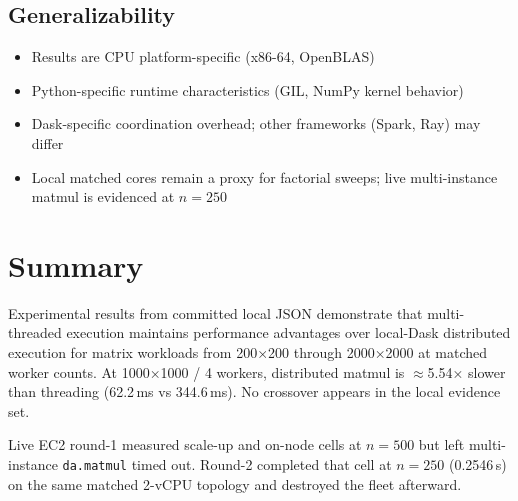 \subsection{Generalizability}

\begin{itemize}
    \item Results are CPU platform-specific (x86-64, OpenBLAS)
    \item Python-specific runtime characteristics (GIL, NumPy kernel behavior)
    \item Dask-specific coordination overhead; other frameworks (Spark, Ray) may differ
    \item Local matched cores remain a proxy for factorial sweeps; live multi-instance matmul is evidenced at $n{=}250$
\end{itemize}

\section{Summary}

Experimental results from committed local JSON demonstrate that multi-threaded execution maintains performance advantages over local-Dask distributed execution for matrix workloads from 200×200 through 2000×2000 at matched worker counts. At 1000×1000 / 4 workers, distributed matmul is $\approx$5.54× slower than threading (62.2\,ms vs 344.6\,ms). No crossover appears in the local evidence set.

Live EC2 round-1 measured scale-up and on-node cells at $n{=}500$ but left multi-instance \texttt{da.matmul} timed out. Round-2 completed that cell at $n{=}250$ (0.2546\,s) on the same matched 2-vCPU topology and destroyed the fleet afterward.
